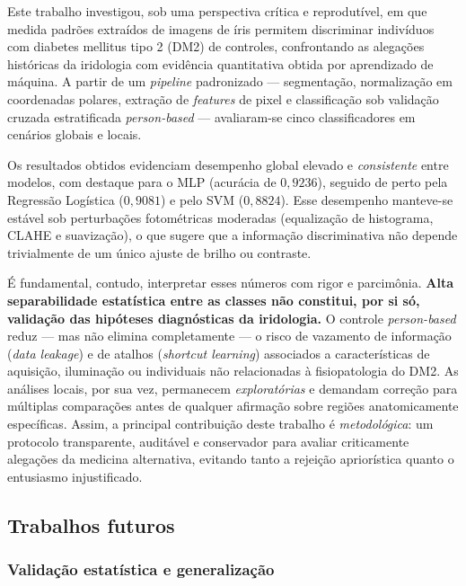 \documentclass[11pt,a4paper]{article}
\begin{document}
Este trabalho investigou, sob uma perspectiva crítica e reprodutível, em que medida padrões
extraídos de imagens de íris permitem discriminar indivíduos com diabetes mellitus tipo 2 (DM2)
de controles, confrontando as alegações históricas da iridologia com evidência quantitativa
obtida por aprendizado de máquina. A partir de um \textit{pipeline} padronizado --- segmentação,
normalização em coordenadas polares, extração de \textit{features} de pixel e classificação sob
validação cruzada estratificada \textit{person-based} --- avaliaram-se cinco classificadores em
cenários globais e locais.

Os resultados obtidos evidenciam desempenho global elevado e \emph{consistente} entre modelos,
com destaque para o MLP (acurácia de \(0{,}9236\)), seguido de perto pela Regressão Logística
(\(0{,}9081\)) e pelo SVM (\(0{,}8824\)). Esse desempenho manteve-se estável sob perturbações
fotométricas moderadas (equalização de histograma, CLAHE e suavização), o que sugere que a
informação discriminativa não depende trivialmente de um único ajuste de brilho ou contraste.

É fundamental, contudo, interpretar esses números com rigor e parcimônia. \textbf{Alta
separabilidade estatística entre as classes não constitui, por si só, validação das hipóteses
diagnósticas da iridologia.} O controle \textit{person-based} reduz --- mas não elimina
completamente --- o risco de vazamento de informação (\textit{data leakage}) e de atalhos
(\textit{shortcut learning}) associados a características de aquisição, iluminação ou individuais
não relacionadas à fisiopatologia do DM2. As análises locais, por sua vez, permanecem
\emph{exploratórias} e demandam correção para múltiplas comparações antes de qualquer afirmação
sobre regiões anatomicamente específicas. Assim, a principal contribuição deste trabalho é
\emph{metodológica}: um protocolo transparente, auditável e conservador para avaliar criticamente
alegações da medicina alternativa, evitando tanto a rejeição apriorística quanto o entusiasmo
injustificado.

\subsection{Trabalhos futuros}

\subsubsection{Validação estatística e generalização}
\end{document}
